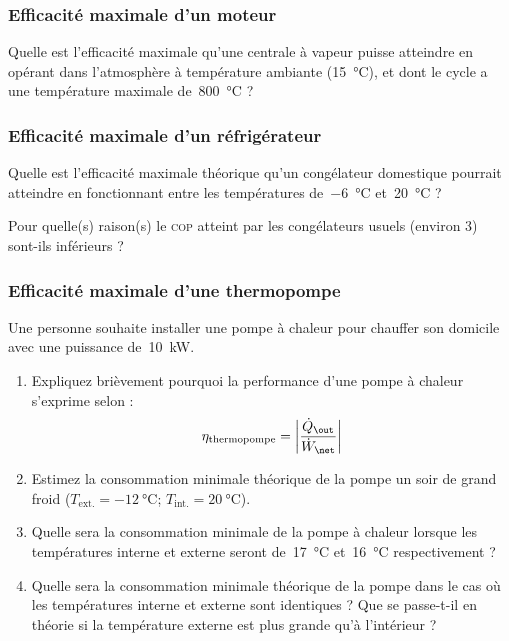 \begin{boiboiboite}
	\propeau
	\propair
	\isentropiques
	\isothermes
	\efficacitescarnot
\end{boiboiboite}


\subsubsection{Efficacité maximale d’un moteur}
\label{exo_efficacite_moteur_carnot}

	Quelle est l’efficacité maximale qu’une centrale à vapeur puisse atteindre en opérant dans l’atmosphère à température ambiante (\SI{15}{\degreeCelsius}), et dont le cycle a une température maximale de~\SI{800}{\degreeCelsius} ?

\subsubsection{Efficacité maximale d’un réfrigérateur}
\label{exo_efficacite_refrigerateur_carnot}

	Quelle est l’efficacité maximale théorique qu’un congélateur domestique pourrait atteindre en fonctionnant entre les températures de~\SI{-6}{\degreeCelsius} et~\SI{20}{\degreeCelsius} ?
	
	Pour quelle(s) raison(s) le \textsc{cop} atteint par les congélateurs usuels (environ \num{3}) sont-ils inférieurs ?
	
\subsubsection{Efficacité maximale d’une thermopompe}
\label{exo_efficacite_thermopompe_carnot}

	Une personne souhaite installer une pompe à chaleur pour chauffer son domicile avec une puissance de~\SI{10}{\kilo\watt}.

	\begin{enumerate}
	
		\item Expliquez brièvement pourquoi la performance d’une pompe à chaleur s’exprime selon :
			\begin{equation}
				\eta_\text{thermopompe} = \left| \frac{\dot Q_\out}{\dot W_\net} \right|
			\end{equation}

		\item Estimez la consommation minimale théorique de la pompe un soir de grand froid ($T_\text{ext.} = \SI{-12}{\degreeCelsius}$; $T_\text{int.} = \SI{20}{\degreeCelsius}$).
		
		\item Quelle sera la consommation minimale de la pompe à chaleur lorsque les températures interne et externe seront de~\SI{17}{\degreeCelsius}  et~\SI{16}{\degreeCelsius} respectivement ? 
		
		\item Quelle sera la consommation minimale théorique de la pompe dans le cas où les températures interne et externe sont identiques ?  Que se passe-t-il en théorie si la température externe est plus grande qu’à l’intérieur ?

	\end{enumerate}


